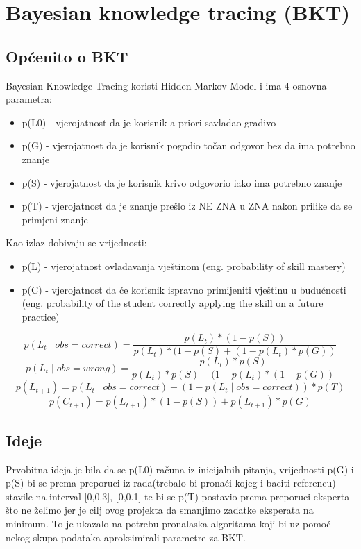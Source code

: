 \documentclass[times, utf8,projekt]{fer}
\begin{document}
\chapter{Bayesian knowledge tracing (BKT)}
\label{ch:BKT}
\section{Općenito o BKT}
Bayesian Knowledge Tracing koristi Hidden Markov Model i ima 4 osnovna parametra:
\begin{itemize}
	\item p(L0) - vjerojatnost da je korisnik a priori savladao gradivo
	\item p(G) - vjerojatnost da je korisnik pogodio točan odgovor bez da ima potrebno znanje	
	\item p(S) - vjerojatnost da je korisnik krivo odgovorio iako ima potrebno znanje	
	\item p(T) - vjerojatnost da je znanje prešlo iz NE ZNA u ZNA nakon prilike da se primjeni znanje
\end{itemize}
Kao izlaz dobivaju se vrijednosti:
\begin{itemize}
	\item p(L) - vjerojatnost ovladavanja vještinom (eng. probability of skill mastery)
	\item p(C) - vjerojatnost da će korisnik ispravno primijeniti vještinu u budućnosti (eng. probability of the student correctly applying the skill on a future practice)\newline
\end{itemize}

\begin{equation}
 p(L_t\mid obs=correct)=\frac{p(L_t)*(1-p(S))}{p(L_t)*(1-p(S)+(1-p(L_t)*p(G))}
\end{equation}\newline
\begin{equation}
 p(L_t\mid obs=wrong)=\frac{p(L_t)*p(S)}{p(L_t)*p(S)+(1-p(L_t)*(1-p(G))}
\end{equation}\newline
\begin{equation}
 p(L_{t+1})=p(L_t\mid obs=correct) + (1-p(L_t\mid obs=correct))*p(T)
\end{equation}\newline
\begin{equation}
 p(C_{t+1})=p(L_{t+1}) * (1-p(S)) + p(L_{t+1})*p(G)
\end{equation}

\section{Ideje}
Prvobitna ideja je bila da se p(L0) računa iz inicijalnih pitanja, vrijednosti p(G) i p(S) bi se prema preporuci iz rada(trebalo bi pronaći kojeg i baciti referencu) stavile na interval [0,0.3], [0,0.1] te bi se p(T) postavio prema preporuci eksperta što ne želimo jer je cilj ovog projekta da smanjimo zadatke eksperata na minimum.\newline
To je ukazalo na potrebu pronalaska algoritama koji bi uz pomoć nekog skupa podataka aproksimirali parametre za BKT.
\end{document}
